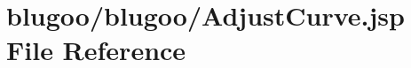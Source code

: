 \hypertarget{AdjustCurve_8jsp}{
\section{blugoo/blugoo/AdjustCurve.jsp File Reference}
\label{AdjustCurve_8jsp}
}



